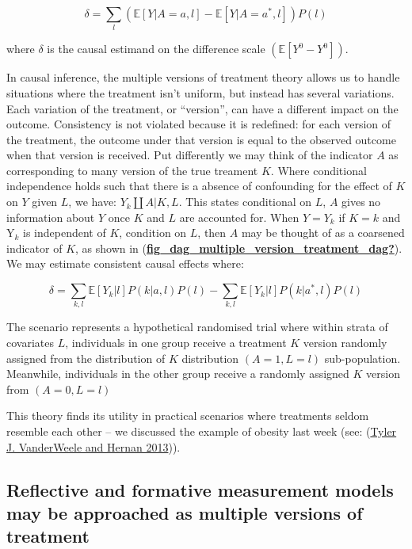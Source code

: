 \documentclass[
  singlecolumn]{report}
\begin{document}
\[ \delta = \sum_l \left( \mathbb{E}[Y|A=a,l] - \mathbb{E}[Y|A=a^*,l] \right) P(l)\]

where \(\delta\) is the causal estimand on the difference scale
\((\mathbb{E}[Y^0 - Y^0])\).

In causal inference, the multiple versions of treatment theory allows us
to handle situations where the treatment isn't uniform, but instead has
several variations. Each variation of the treatment, or ``version'', can
have a different impact on the outcome. Consistency is not violated
because it is redefined: for each version of the treatment, the outcome
under that version is equal to the observed outcome when that version is
received. Put differently we may think of the indicator \(A\) as
corresponding to many version of the true treament \(K\). Where
conditional independence holds such that there is a absence of
confounding for the effect of \(K\) on \(Y\) given \(L\), we have:
\(Y_k \coprod A|K,L\). This states conditional on \(L\), \(A\) gives no
information about \(Y\) once \(K\) and \(L\) are accounted for. When
\(Y = Y_k\) if \(K = k\) and Y\(_k\) is independent of \(K\), condition
on \(L\), then \(A\) may be thought of as a coarsened indicator of
\(K\), as shown in
(\protect\hyperlink{ref-fig_dag_multiple_version_treatment_dag}{\textbf{fig\_dag\_multiple\_version\_treatment\_dag?}}).
We may estimate consistent causal effects where:

\[ \delta = \sum_{k,l} \mathbb{E}[Y_k|l] P(k|a,l) P(l) - \sum_{k,l} \mathbb{E}[Y_k|l] P(k|a^*,l) P(l)\]

The scenario represents a hypothetical randomised trial where within
strata of covariates \(L\), individuals in one group receive a treatment
\(K\) version randomly assigned from the distribution of \(K\)
distribution \((A = 1, L = l)\) sub-population. Meanwhile, individuals
in the other group receive a randomly assigned \(K\) version from
\((A = 0, L = l)\)

This theory finds its utility in practical scenarios where treatments
seldom resemble each other -- we discussed the example of obesity last
week (see: (\protect\hyperlink{ref-vanderweele2013}{Tyler J. VanderWeele
and Hernan 2013})).

\hypertarget{reflective-and-formative-measurement-models-may-be-approached-as-multiple-versions-of-treatment}{%
\subsection{Reflective and formative measurement models may be
approached as multiple versions of
treatment}\label{reflective-and-formative-measurement-models-may-be-approached-as-multiple-versions-of-treatment}}
\end{document}

